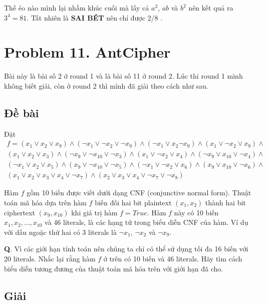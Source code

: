 Thế éo nào mình lại nhầm khúc cuối mà lấy cả $a^2$, $ab$ và $b^2$ nên kết quả ra $3^4 = 81$. Tất nhiên là \textbf{SAI BÉT} nên chỉ được 2/8 .

\section*{Problem 11. AntCipher}

Bài này là bài số 2 ở round 1 và là bài số 11 ở round 2. Lúc thi round 1 mình không biết giải, còn ở round 2 thì mình đã giải theo cách như sau.

\subsection*{Đề bài}

Đặt
\begin{align*}
    f = (x_1 \lor x_2 \lor x_9) \land (\lnot x_1 \lor \lnot x_2 \lor \lnot x_9) \land (\lnot x_1 \lor x_2 \lnot x_9) \land (x_1 \lor \lnot x_2 \lor x_9) \land \\
    (x_1 \lor x_2 \lor x_3) \land (\lnot x_9 \lor \lnot x_{10} \lor \lnot x_3) \land (x_1 \lor \lnot x_2 \lor x_4) \land (\lnot x_9 \lor x_{10} \lor \lnot x_4) \land \\
    (\lnot x_1 \lor x_2 \lor x_5) \land (x_9 \lor \lnot x_{10} \lor \lnot x_5) \land (\lnot x_1 \lor \lnot x_2 \lor x_6) \land (x_9 \lor x_{10} \lor \lnot x_6) \land \\
    (x_1 \lor x_2 \lor x_3 \lor x_4 \lor \lnot x_7) \land (x_2 \lor x_3 \lor x_4 \lor \lnot x_7 \lor \lnot x_8)
\end{align*}

Hàm $f$ gồm 10 biến được viết dưới dạng CNF (conjunctive normal form). Thuật toán mã hóa dựa trên hàm $f$ biến đối hai bit plaintext $(x_1, x_2)$ thành hai bit ciphertext $(x_9, x_{10})$ khi giá trị hàm $f = True$. Hàm $f$ này có 10 biến $x_1, x_2, \ldots, x_{10}$ và 46 literals, là các hạng tử trong biểu diễn CNF của hàm. Ví dụ với dấu ngoặc thứ hai có 3 literals là $\lnot x_1$, $\lnot x_2$ và $\lnot x_9$.

\textbf{Q}. Vì các giới hạn tính toán nên chúng ta chỉ có thể sử dụng tối đa 16 biến với 20 literals. Nhắc lại rằng hàm $f$ ở trên có 10 biến và 46 literals. Hãy tìm cách biểu diễn tương đương của thuật toán mã hóa trên với giới hạn đã cho.

\subsection*{Giải}

